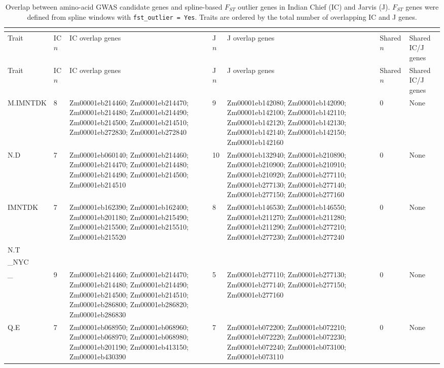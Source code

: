 \begin{longtable}{p{1.9cm}p{0.9cm}p{4.8cm}p{0.9cm}p{4.8cm}p{0.9cm}p{3.2cm}}
\caption{Overlap between amino-acid GWAS candidate genes and spline-based $F_{ST}$ outlier genes in Indian Chief (IC) and Jarvis (J). $F_{ST}$ genes were defined from spline windows with \texttt{fst\_outlier = Yes}. Traits are ordered by the total number of overlapping IC and J genes.}\\
\label{tab:fst_amino_gwas_overlap_all}\\
\hline
Trait & IC $n$ & IC overlap genes & J $n$ & J overlap genes & Shared $n$ & Shared IC/J genes \\
\hline
\endfirsthead
\hline
Trait & IC $n$ & IC overlap genes & J $n$ & J overlap genes & Shared $n$ & Shared IC/J genes \\
\hline
\endhead
\hline
\endfoot
M.IMNTDK & 8 & Zm00001eb214460; Zm00001eb214470; Zm00001eb214480; Zm00001eb214490; Zm00001eb214500; Zm00001eb214510; Zm00001eb272830; Zm00001eb272840 & 9 & Zm00001eb142080; Zm00001eb142090; Zm00001eb142100; Zm00001eb142110; Zm00001eb142120; Zm00001eb142130; Zm00001eb142140; Zm00001eb142150; Zm00001eb142160 & 0 & None \\
N.D & 7 & Zm00001eb060140; Zm00001eb214460; Zm00001eb214470; Zm00001eb214480; Zm00001eb214490; Zm00001eb214500; Zm00001eb214510 & 10 & Zm00001eb132940; Zm00001eb210890; Zm00001eb210900; Zm00001eb210910; Zm00001eb210920; Zm00001eb277110; Zm00001eb277130; Zm00001eb277140; Zm00001eb277150; Zm00001eb277160 & 0 & None \\
IMNTDK & 7 & Zm00001eb162390; Zm00001eb162400; Zm00001eb201180; Zm00001eb215490; Zm00001eb215500; Zm00001eb215510; Zm00001eb215520 & 8 & Zm00001eb146530; Zm00001eb146550; Zm00001eb211270; Zm00001eb211280; Zm00001eb211290; Zm00001eb277210; Zm00001eb277230; Zm00001eb277240 & 0 & None \\
N.T\\_NYC\\_ & 9 & Zm00001eb214460; Zm00001eb214470; Zm00001eb214480; Zm00001eb214490; Zm00001eb214500; Zm00001eb214510; Zm00001eb286800; Zm00001eb286820; Zm00001eb286830 & 5 & Zm00001eb277110; Zm00001eb277130; Zm00001eb277140; Zm00001eb277150; Zm00001eb277160 & 0 & None \\
Q.E & 7 & Zm00001eb068950; Zm00001eb068960; Zm00001eb068970; Zm00001eb068980; Zm00001eb201190; Zm00001eb413150; Zm00001eb430390 & 7 & Zm00001eb072200; Zm00001eb072210; Zm00001eb072220; Zm00001eb072230; Zm00001eb072240; Zm00001eb073100; Zm00001eb073110 & 0 & None \\

\end{longtable}
